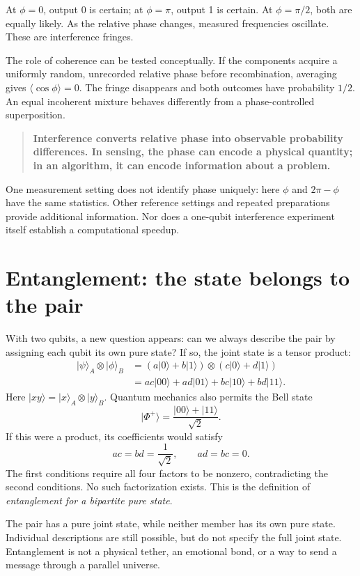 \documentclass[11pt,a4paper]{article}
\newcommand{\ket}[1]{\lvert #1\rangle}
\newcommand{\takeaway}[1]{\begin{quote}\color{ink}\textbf{#1}\end{quote}}
\begin{document}
At $\phi=0$, output 0 is certain; at $\phi=\pi$, output 1 is certain. At $\phi=\pi/2$, both are equally likely. As the relative phase changes, measured frequencies oscillate. These are interference fringes.

The role of coherence can be tested conceptually. If the components acquire a uniformly random, unrecorded relative phase before recombination, averaging gives $\langle\cos\phi\rangle=0$. The fringe disappears and both outcomes have probability $1/2$. An equal incoherent mixture behaves differently from a phase-controlled superposition.

\takeaway{Interference converts relative phase into observable probability differences. In sensing, the phase can encode a physical quantity; in an algorithm, it can encode information about a problem.}
One measurement setting does not identify phase uniquely: here $\phi$ and $2\pi-\phi$ have the same statistics. Other reference settings and repeated preparations provide additional information. Nor does a one-qubit interference experiment itself establish a computational speedup.

\newpage
\section{Entanglement: the state belongs to the pair}
With two qubits, a new question appears: can we always describe the pair by assigning each qubit its own pure state? If so, the joint state is a tensor product:
\begin{align}
\ket{\psi}_A\otimes\ket{\phi}_B
&=(a\ket{0}+b\ket{1})\otimes(c\ket{0}+d\ket{1})\\
&=ac\ket{00}+ad\ket{01}+bc\ket{10}+bd\ket{11}.
\end{align}
Here $\ket{xy}=\ket{x}_A\otimes\ket{y}_B$. Quantum mechanics also permits the Bell state
\begin{equation}\label{eq:bell}
\boxed{\ket{\Phi^+}=\frac{\ket{00}+\ket{11}}{\sqrt2}.}
\end{equation}
If this were a product, its coefficients would satisfy
\[
ac=bd=\frac1{\sqrt2},\qquad ad=bc=0.
\]
The first conditions require all four factors to be nonzero, contradicting the second conditions. No such factorization exists. This is the definition of \emph{entanglement for a bipartite pure state}.

The pair has a pure joint state, while neither member has its own pure state. Individual descriptions are still possible, but do not specify the full joint state. Entanglement is not a physical tether, an emotional bond, or a way to send a message through a parallel universe.
\end{document}
